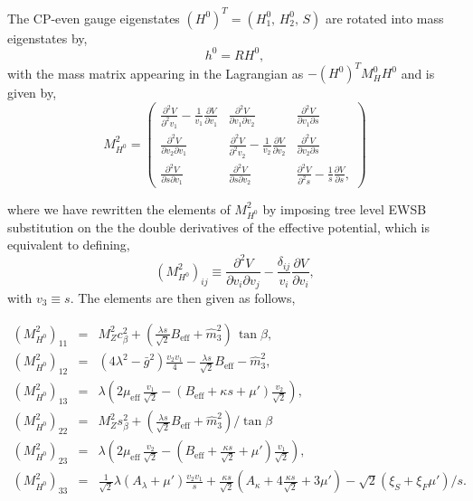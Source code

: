 \documentclass[final,3p,times,pdflatex]{elsarticle}
\newcommand{\be}{\begin{equation}}
\newcommand{\ee}{\end{equation}}
\newcommand{\ba}{\begin{eqnarray}}
\newcommand{\ea}{\end{eqnarray}}
\newcommand{\ds}{\displaystyle}
\begin{document}
The CP-even gauge eigenstates $(H^0)^T = (H_1^0,\, H_2^0, \, S)$ are rotated into mass eigenstates by,
\be h^0 = R H^0, \ee with the mass matrix appearing in the Lagrangian as  $-(H^0)^T M_H^0 H^0$ and is given by,
\be
M_{H^0}^2=
\left(
\begin{array}{ccc}
\ds\frac{\partial^2 V}{\partial^2 v_1 } - \ds\frac{1}{v_1}\frac{\partial V}{\partial v_1}&
\ds\frac{\partial^2 V}{\partial v_1 \partial v_2}&
\ds\frac{\partial^2 V}{\partial v_1 \partial s}\\[0.3cm]
\ds\frac{\partial^2 V}{\partial v_2 \partial v_1}&
\ds\frac{\partial^2 V}{\partial^2 v_2} - \ds\frac{1}{v_2}\frac{\partial V}{\partial v_2}&
\ds\frac{\partial^2 V}{\partial v_2 \partial s}\\[0.3cm]
\ds\frac{\partial^2 V}{\partial s \partial v_1}&
\ds\frac{\partial^2 V}{\partial s \partial v_2}&
\ds\frac{\partial^2 V}{\partial^2 s} - \ds\frac{1}{s}\frac{\partial V}{\partial s},
\end{array} 
\right)
 \ee

where we have rewritten the elements of $M_{H^0}^2$ by imposing tree level EWSB substitution on the the double derivatives of the effective potential, which is equivalent to defining,  \be(M_{H^0}^2)_{ij} \equiv  \ds\frac{\partial^2 V}{\partial v_i \partial v_j} - \ds\frac{\delta_{ij}}{v_i}\ds\frac{\partial V}{\partial v_i}, \ee with $v_3 \equiv s$.  The elements are then given as follows,   

\ba
 (M_{H^0}^2)_{11} & = & M_Z^2 c_\beta^2 + (\ds\frac{\lambda s}{\sqrt{2}} B_\textrm{eff} +
\widehat{m}_3^2)\,\tan\beta,\\
 (M_{H^0}^2)_{12} & = & (4\lambda^2 - \bar{g}^2) \ds\frac{v_2 v_1 }{4}- 
\ds\frac{\lambda s}{\sqrt{2}} B_\textrm{eff} - \widehat{m}_3^2, \\ 
 (M_{H^0}^2)_{13} & = & \lambda (2 \mu_\textrm{eff}\,\ds\frac{ v_1}{\sqrt{2}} -
(B_\textrm{eff} + \kappa s + \mu')\ds\frac{ v_2}{\sqrt{2}}),\\
 (M_{H^0}^2)_{22} & = & M_Z^2 s_\beta^2 + (\ds\frac{\lambda s}{\sqrt{2}} B_\textrm{eff} +
\widehat{m}_3^2)/\tan\beta\, \\
 (M_{H^0}^2)_{23} & = & \lambda (2 \mu_\textrm{eff}\, \ds\frac{ v_2}{\sqrt{2}} -
(B_\textrm{eff} + \frac{\kappa s}{\sqrt{2}} + \mu')\ds\frac{ v_1}{\sqrt{2}}), \\
 (M_{H^0}^2)_{33} & = & \ds\frac{1}{\sqrt{2}}\lambda (A_\lambda + \mu') \frac{v_2 v_1}{s}
+ \frac{\kappa s}{\sqrt{2}} (A_\kappa + 4\frac{\kappa s}{\sqrt{2}}+ 3 \mu') - \sqrt{2}(\xi_S + \xi_F \mu')/s.
\label{eq:MH0}
\ea
\end{document}
